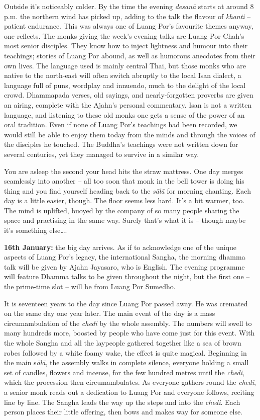 Outside it's noticeably colder. By the time the evening \emph{desanā}
starts at around 8 p.m. the northern wind has picked up, adding to the
talk the flavour of \emph{khanti} -- patient endurance. This was always
one of Luang Por's favourite themes anyway, one reflects. The monks
giving the week's evening talks are Luang Por Chah's most senior
disciples. They know how to inject lightness and humour into their
teachings; stories of Luang Por abound, as well as humorous anecdotes
from their own lives. The language used is mainly central Thai, but
those monks who are native to the north-east will often switch abruptly
to the local Isan dialect, a language full of puns, wordplay and
innuendo, much to the delight of the local crowd. Dhammapada verses, old
sayings, and nearly-forgotten proverbs are given an airing, complete
with the Ajahn's personal commentary. Isan is not a written language, 
and listening to these old monks one gets a sense of the power of an
oral tradition. Even if none of Luang Por's teachings had been recorded, 
we would still be able to enjoy them today from the minds and through
the voices of the disciples he touched. The Buddha's teachings were not
written down for several centuries, yet they managed to survive in a
similar way. 

You are asleep the second your head hits the straw mattress. One day
merges seamlessly into another -- all too soon that monk in the bell
tower is doing his thing and you find yourself heading back to the
\emph{sālā} for morning chanting. Each day is a little easier, though. 
The floor seems less hard. It's a bit warmer, too. The mind is uplifted, 
buoyed by the company of so many people sharing the space and practising
in the same way. Surely that's what it is -- though maybe it's something
else\ldots{}. 

\textbf{16th January:} the big day arrives. As if to acknowledge one of
the unique aspects of Luang Por's legacy, the international Sangha, the
morning dhamma talk will be given by Ajahn Jayasaro, who is English. The
evening programme will feature Dhamma talks to be given throughout the
night, but the first one -- the prime-time slot -- will be from Luang
Por Sumedho. 

It is seventeen years to the day since Luang Por passed away. He was
cremated on the same day one year later. The main event of the day is a
mass circumambulation of the \emph{chedi} by the whole assembly. The
numbers will swell to many hundreds more, boosted by people who have
come just for this event. With the whole Sangha and all the laypeople
gathered together like a sea of brown robes followed by a white foamy
wake, the effect is quite magical. Beginning in the main s\emph{ālā}, 
the assembly walks in complete silence, everyone holding a small set of
candles, flowers and incense, for the few hundred metres until the
\emph{chedi}, which the procession then circumambulates. As everyone
gathers round the \emph{chedi}, a senior monk reads out a dedication to
Luang Por and everyone follows, reciting line by line. The Sangha leads
the way up the steps and into the \emph{chedi}. Each person places their
little offering, then bows and makes way for someone else. 

